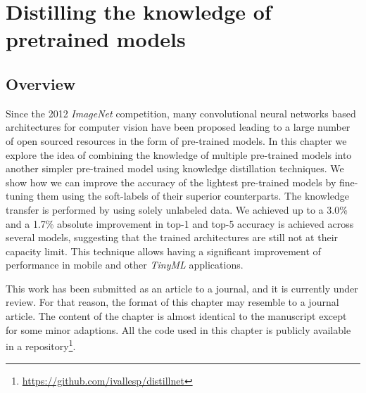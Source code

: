 \chapter{Distilling the knowledge of pretrained models} \label{ch:distillation}
\section{Overview}
Since the 2012 \textit{ImageNet} competition, many convolutional neural networks based architectures for computer vision have been proposed leading to a large number of open sourced resources in the form of pre-trained models. In this chapter we explore the idea of combining the knowledge of multiple pre-trained models into another simpler pre-trained model using knowledge distillation techniques. We show how we can improve the accuracy of the lightest pre-trained models by fine-tuning them using the soft-labels of their superior counterparts. The knowledge transfer is performed by using solely unlabeled data. We achieved up to a 3.0\% and a 1.7\% absolute improvement in top-1 and top-5 accuracy is achieved across several models, suggesting that the trained architectures are still not at their capacity limit. This technique allows having a significant improvement of performance in mobile and other \textit{TinyML} applications.

This work has been submitted as an article to a journal, and it is currently under review. For that reason, the format of this chapter may resemble to a journal article. The content of the chapter is almost identical to the manuscript except for some minor adaptions. All the code used in this chapter is publicly available in a repository\footnote{\url{https://github.com/ivallesp/distillnet}}.

